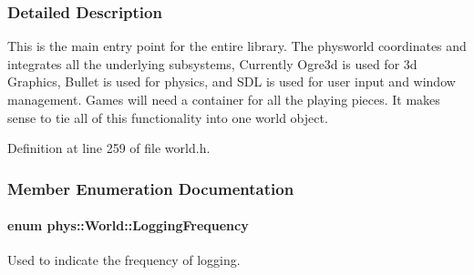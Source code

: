 \subsubsection{Detailed Description}
This is the main entry point for the entire library. The physworld coordinates and integrates all the underlying subsystems, Currently Ogre3d is used for 3d Graphics, Bullet is used for physics, and SDL is used for user input and window management. Games will need a container for all the playing pieces. It makes sense to tie all of this functionality into one world object. 

Definition at line 259 of file world.h.



\subsubsection{Member Enumeration Documentation}
\hypertarget{classphys_1_1World_a8c754464edbb78270fa0ee1e395b963d}{
\paragraph[{LoggingFrequency}]{\setlength{\rightskip}{0pt plus 5cm}enum {\bf phys::World::LoggingFrequency}}\hfill}
\label{classphys_1_1World_a8c754464edbb78270fa0ee1e395b963d}


Used to indicate the frequency of logging. 

